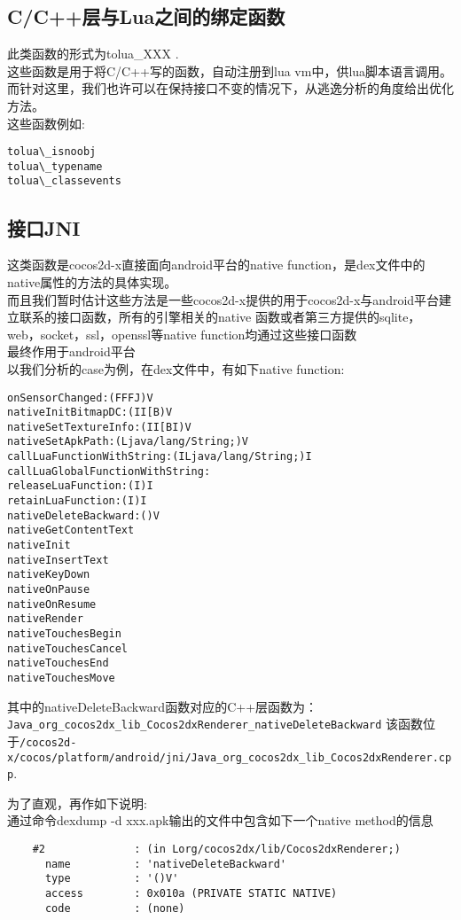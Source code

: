 \subsection{C/C++层与Lua之间的绑定函数}
\label{sec:so:bindlib}
此类函数的形式为tolua\_XXX .\\
这些函数是用于将C/C++写的函数，自动注册到lua vm中，供lua脚本语言调用。\\
而针对这里，我们也许可以在保持接口不变的情况下，从逃逸分析的角度给出优化方法。\\
这些函数例如:\\
\begin{lstlisting}
tolua\_isnoobj
tolua\_typename
tolua\_classevents
\end{lstlisting}

\subsection{接口JNI}
\label{sec:so:appjnilib}
这类函数是cocos2d-x直接面向android平台的native function，是dex文件中的native属性的方法的具体实现。\\
而且我们暂时估计这些方法是一些cocos2d-x提供的用于cocos2d-x与android平台建立联系的接口函数，所有的引擎相关的native 函数或者第三方提供的sqlite，web，socket，ssl，openssl等native function均通过这些接口函数\\
最终作用于android平台\\

以我们分析的case为例，在dex文件中，有如下native function:\\
\begin{lstlisting}
onSensorChanged:(FFFJ)V
nativeInitBitmapDC:(II[B)V
nativeSetTextureInfo:(II[BI)V
nativeSetApkPath:(Ljava/lang/String;)V
callLuaFunctionWithString:(ILjava/lang/String;)I
callLuaGlobalFunctionWithString:
releaseLuaFunction:(I)I
retainLuaFunction:(I)I
nativeDeleteBackward:()V
nativeGetContentText
nativeInit
nativeInsertText
nativeKeyDown
nativeOnPause
nativeOnResume
nativeRender
nativeTouchesBegin
nativeTouchesCancel
nativeTouchesEnd
nativeTouchesMove
\end{lstlisting}

其中的nativeDeleteBackward函数对应的C++层函数为：
\verb|Java_org_cocos2dx_lib_Cocos2dxRenderer_nativeDeleteBackward|
该函数位于\verb|/cocos2d-x/cocos/platform/android/jni/Java_org_cocos2dx_lib_Cocos2dxRenderer.cpp|.

为了直观，再作如下说明:\\
通过命令dexdump -d xxx.apk输出的文件中包含如下一个native method的信息\\
\begin{lstlisting}
    #2              : (in Lorg/cocos2dx/lib/Cocos2dxRenderer;)
      name          : 'nativeDeleteBackward'
      type          : '()V'
      access        : 0x010a (PRIVATE STATIC NATIVE)
      code          : (none)
\end{lstlisting}

